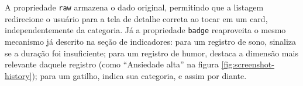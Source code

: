 A propriedade \texttt{raw} armazena o dado original, permitindo que a
listagem redirecione o usuário para a tela de detalhe correta ao tocar em
um card, independentemente da categoria. Já a propriedade \texttt{badge}
reaproveita o mesmo mecanismo já descrito na seção de indicadores: para
um registro de sono, sinaliza se a duração foi insuficiente; para um
registro de humor, destaca a dimensão mais relevante daquele registro
(como ``Ansiedade alta'' na figura \ref{fig:screenshot-history}); para um
gatilho, indica sua categoria, e assim por diante.

\FloatBarrier
